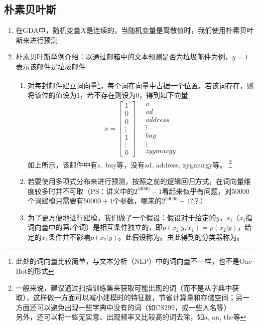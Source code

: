 \subsection{朴素贝叶斯}
\begin{enumerate}
	\item 在GDA中，随机变量$X$是连续的，当随机变量是离散值时，我们使用朴素贝叶斯来进行预测
	\item 朴素贝叶斯举例介绍：以通过邮箱中的文本预测是否为垃圾邮件为例，$y=1$表示该邮件是垃圾邮件
	\begin{enumerate}
		\item 对每封邮件建立词向量\footnote{此处的词向量比较简单，与文本分析（NLP）中的词向量不一样，也不是One-Hot的形式}，每个词在向量中占据一个位置，若该词存在，则将该位的值设为1，若不存在则设为0，得到如下向量
		\begin{align}
			x = \left[\begin{matrix}1 \\ 0 \\ 0 \\ \vdots \\ 1 \\ \vdots \\ 0 \end{matrix}\right] \quad
			\begin{matrix}a \\ ad \\ address \\ \vdots \\ buy \\ \vdots \\ zygmurgy \end{matrix}
		\end{align}
		如上所示，该邮件中有a, buy等，没有ad, address, zygmurgy等。
		\footnote{一般来说，建议通过扫描训练集来获取可能出现的词（而不是从字典中获取），这样做一方面可以减小建模时的特征数，节省计算量和存储空间；另一方面还可以避免出现一些字典中没有的词（如CS299，或一些人名等）\\
		另外，还可以将一些无实意、出现频率又比较高的词去除，如a, an, the等}
		\item 若要使用多项式分布来进行预测，按照之前的逻辑回归方式，在词向量维度较多时并不可取（PS：讲义中的$2^{50000}-1$看起来似乎有问题，对$50000$个词建模只需要有$50000+1$个参数，哪来的$2^{50000}-1$?？{\color{red}{待研究...}}）
		\item 为了更方便地进行建模，我们做了一个假设：假设对于给定的$y$，$x_i$（$x_i$指词向量中的第$i$个词）是相互条件独立的，即$p(x_2|y, x_1) = p(x_2|y)$，给定的$x_1$条件并不影响$p(x_2|y)$。此假设称为{\color{blue}{朴素贝叶斯假设}}。由此得到的分类器称为{\color{blue}{朴素贝叶斯分类器}}。

\end{enumerate}
\end{enumerate}
